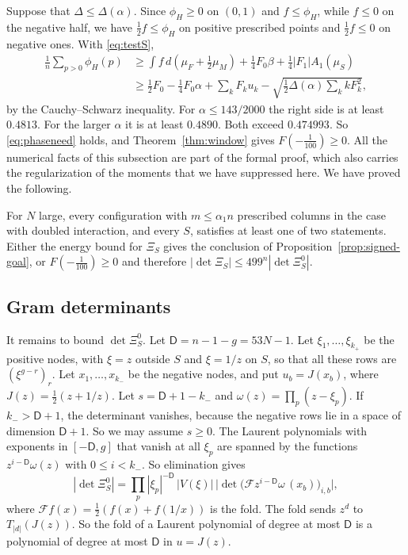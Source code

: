 Suppose that $\Delta\le\Delta(\alpha)$. Since $\phi_H\ge0$ on $(0,1)$ and $f\le\phi_H$, while $f\le0$ on the negative
half, we have $\frac12f\le\phi_H$ on positive prescribed points and $\frac12f\le0$ on negative ones. With
\eqref{eq:testS},
\begin{align*}
 \frac1n\sum_{p>0}\phi_H(p)&\ge\int f\,d(\mu_F+\tfrac12\mu_M)+\tfrac14F_0\beta+\tfrac14|F_1|A_1(\mu_S)\\
 &\ge\tfrac12F_0-\tfrac14F_0\alpha+\sum_kF_ku_k-\sqrt{\tfrac12\Delta(\alpha)\sum_kkF_k^2},
\end{align*}
by the Cauchy--Schwarz inequality. For $\alpha\le143/2000$ the right side is at least $0.4813$. For the larger
$\alpha$ it is at least $0.4890$. Both exceed $0.474993$. So \eqref{eq:phaseneed} holds, and
Theorem~\ref{thm:window} gives $F(-\frac1{100})\ge0$. All the numerical facts of this subsection are part of the formal proof, which also carries the regularization of the moments that we have suppressed here. We have proved the following.

\begin{proposition}\label{prop:alternative}
For $N$ large, every configuration with $m\le\alpha_1n$ prescribed columns in the case with doubled interaction, and
every $S$, satisfies at least one of two statements. Either the energy bound for $\Xi_S$ gives the conclusion
of Proposition~\ref{prop:signed-goal}, or $F(-\frac1{100})\ge0$ and therefore
$|\det\Xi_S|\le499^n|\det\Xi^0_S|$.
\end{proposition}

\subsection{Gram determinants}\label{ssec:gram}
It remains to bound $\det\Xi^0_S$. Let $\mathsf D=n-1-g=53N-1$. Let $\xi_1,\ldots,\xi_{k_+}$ be the positive nodes, with
$\xi=z$ outside $S$ and $\xi=1/z$ on $S$, so that all these rows are $(\xi^{g-r})_r$. Let $x_1,\ldots,x_{k_-}$ be the
negative nodes, and put $u_b=J(x_b)$, where $J(z)=\frac12(z+1/z)$. Let $s=\mathsf D+1-k_-$ and $\omega(z)=\prod_p(z-\xi_p)$. If
$k_->\mathsf D+1$, the determinant vanishes, because the negative rows lie in a space of dimension $\mathsf D+1$. So we may assume
$s\ge0$. The Laurent polynomials with exponents in $[-\mathsf D,g]$ that vanish at all $\xi_p$ are spanned by the functions
$z^{i-\mathsf D}\omega(z)$ with $0\le i<k_-$. So elimination gives
\begin{equation}\label{eq:split}
 |\det\Xi^0_S|=\prod_p|\xi_p|^{-\mathsf D}\,|V(\xi)|\,\bigl|\det\bigl(\mathcal Fz^{i-\mathsf D}\omega\,(x_b)\bigr)_{i,b}\bigr|,
\end{equation}
where $\mathcal Ff(x)=\frac12(f(x)+f(1/x))$ is the fold. The fold sends $z^d$ to $T_{|d|}(J(z))$. So the fold of a Laurent
polynomial of degree at most $\mathsf D$ is a polynomial of degree at most $\mathsf D$ in $u=J(z)$.

